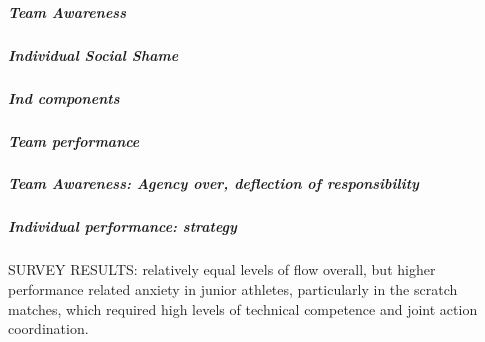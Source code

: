 
          \subparagraph{Team Awareness}

          \subparagraph{Individual Social Shame}

        \subparagraph{Ind components}
        \subparagraph{Team performance}


          \subparagraph{Team Awareness: Agency over, deflection of responsibility}
        \subparagraph{Individual performance: strategy}



      SURVEY RESULTS: relatively equal levels of flow overall, but higher performance related anxiety in junior athletes, particularly in the scratch matches, which required high levels of technical competence and joint action coordination.


